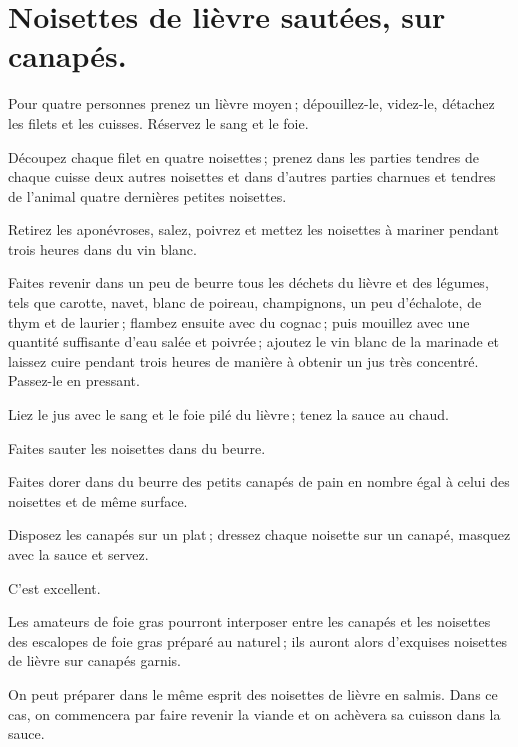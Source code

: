 \section*{\centering Noisettes de lièvre sautées, sur canapés.}
{}

Pour quatre personnes prenez un lièvre moyen ; dépouillez-le, videz-le,
détachez les filets et les cuisses. Réservez le sang et le foie.

Découpez chaque filet en quatre noisettes ; prenez dans les parties tendres de
chaque cuisse deux autres noisettes et dans d'autres parties charnues et
tendres de l'animal quatre dernières petites noisettes.

Retirez les aponévroses, salez, poivrez et mettez les noisettes à mariner
pendant trois heures dans du vin blanc.

Faites revenir dans un peu de beurre tous les déchets du lièvre et des légumes,
tels que carotte, navet, blanc de poireau, champignons, un peu d'échalote, de
thym et de laurier ; flambez ensuite avec du cognac ; puis mouillez avec une
quantité suffisante d'eau salée et poivrée ; ajoutez le vin blanc de la
marinade et laissez cuire pendant trois heures de manière à obtenir un jus très
concentré. Passez-le en pressant.

Liez le jus avec le sang et le foie pilé du lièvre ; tenez la sauce au chaud.

Faites sauter les noisettes dans du beurre.

Faites dorer dans du beurre des petits canapés de pain en nombre égal à celui
des noisettes et de même surface.

Disposez les canapés sur un plat ; dressez chaque noisette sur un canapé,
masquez avec la sauce et servez.

C'est excellent.

\sk

Les amateurs de foie gras pourront interposer entre les canapés et les
noisettes des escalopes de foie gras préparé au naturel ; ils auront alors
d'exquises noisettes de lièvre sur canapés garnis.

\sk

On peut préparer dans le même esprit des noisettes de lièvre en salmis. Dans ce
cas, on commencera par faire revenir la viande et on achèvera sa cuisson dans
la sauce.

